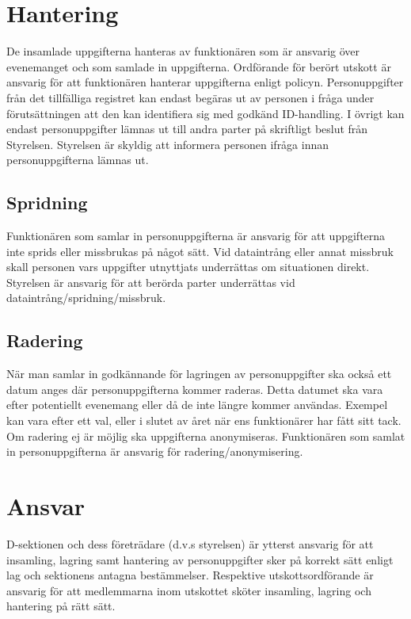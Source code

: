 \documentclass{dsekprotokoll}
\begin{document}
\section{Hantering}
De insamlade uppgifterna hanteras av funktionären som är ansvarig över evenemanget och som samlade
in uppgifterna. Ordförande för berört utskott är ansvarig för att funktionären hanterar uppgifterna enligt policyn. Personuppgifter från det tillfälliga registret kan endast begäras ut av personen i fråga under förutsättningen att den kan identifiera sig med godkänd ID-handling. I övrigt kan endast personuppgifter lämnas ut till andra parter på skriftligt beslut från Styrelsen. Styrelsen är skyldig att informera personen ifråga innan personuppgifterna lämnas ut.

\subsection{Spridning}
Funktionären som samlar in personuppgifterna är ansvarig för att uppgifterna inte sprids eller missbrukas på något sätt. Vid dataintrång eller annat missbruk skall personen vars uppgifter utnyttjats underrättas om situationen direkt. Styrelsen är ansvarig för att berörda parter underrättas vid dataintrång/spridning/missbruk.

\subsection{Radering}
När man samlar in godkännande för lagringen av personuppgifter ska också ett datum anges
där personuppgifterna kommer raderas. Detta datumet ska vara efter potentiellt evenemang
eller då de inte längre kommer användas. Exempel kan vara efter ett val, eller i slutet av året
när ens funktionärer har fått sitt tack. Om radering ej är möjlig ska
uppgifterna anonymiseras. Funktionären som samlat in personuppgifterna är ansvarig för
radering/anonymisering.

\section{Ansvar}
D-sektionen och dess företrädare (d.v.s styrelsen) är ytterst ansvarig för att insamling, lagring samt hantering av personuppgifter sker på korrekt sätt enligt lag och sektionens antagna bestämmelser. Respektive utskottsordförande är ansvarig för att medlemmarna inom utskottet
sköter insamling, lagring och hantering på rätt sätt.

\end{document}

